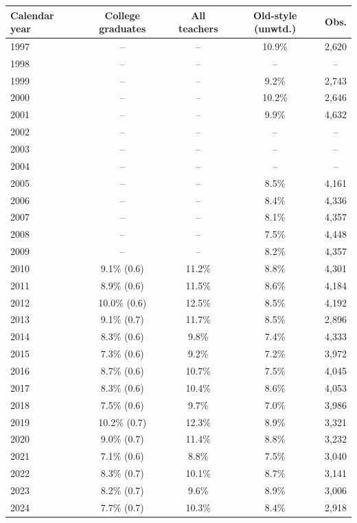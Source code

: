 \begin{tabular}{lcccc}
\toprule
Calendar year & College graduates & All teachers & Old-style (unwtd.) & Obs. \\
\midrule
1997 & -- & -- & 10.9\% & 2,620 \\
1998 & -- & -- & -- & -- \\
1999 & -- & -- & 9.2\% & 2,743 \\
2000 & -- & -- & 10.2\% & 2,646 \\
2001 & -- & -- & 9.9\% & 4,632 \\
2002 & -- & -- & -- & -- \\
2003 & -- & -- & -- & -- \\
2004 & -- & -- & -- & -- \\
2005 & -- & -- & 8.5\% & 4,161 \\
2006 & -- & -- & 8.4\% & 4,336 \\
2007 & -- & -- & 8.1\% & 4,357 \\
2008 & -- & -- & 7.5\% & 4,448 \\
2009 & -- & -- & 8.2\% & 4,357 \\
2010 & 9.1\% (0.6) & 11.2\% & 8.8\% & 4,301 \\
2011 & 8.9\% (0.6) & 11.5\% & 8.6\% & 4,184 \\
2012 & 10.0\% (0.6) & 12.5\% & 8.5\% & 4,192 \\
2013 & 9.1\% (0.7) & 11.7\% & 8.5\% & 2,896 \\
2014 & 8.3\% (0.6) & 9.8\% & 7.4\% & 4,333 \\
2015 & 7.3\% (0.6) & 9.2\% & 7.2\% & 3,972 \\
2016 & 8.7\% (0.6) & 10.7\% & 7.5\% & 4,045 \\
2017 & 8.3\% (0.6) & 10.4\% & 8.6\% & 4,053 \\
2018 & 7.5\% (0.6) & 9.7\% & 7.0\% & 3,986 \\
2019 & 10.2\% (0.7) & 12.3\% & 8.9\% & 3,321 \\
2020 & 9.0\% (0.7) & 11.4\% & 8.8\% & 3,232 \\
2021 & 7.1\% (0.6) & 8.8\% & 7.5\% & 3,040 \\
2022 & 8.3\% (0.7) & 10.1\% & 8.7\% & 3,141 \\
2023 & 8.2\% (0.7) & 9.6\% & 8.9\% & 3,006 \\
2024 & 7.7\% (0.7) & 10.3\% & 8.4\% & 2,918 \\
\bottomrule
\end{tabular}
